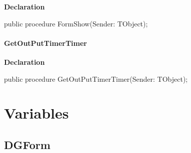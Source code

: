 \documentclass{report}
\newif\ifpdf
\begin{document}
\label{dgunit.TDGForm-FormShow}
\begin{list}{}{
\setlength{\itemindent}{0cm}
\setlength{\listparindent}{0cm}
\setlength{\leftmargin}{\evensidemargin}
\addtolength{\leftmargin}{\tmplength}
\settowidth{\labelsep}{X}
\addtolength{\leftmargin}{\labelsep}
\setlength{\labelwidth}{\tmplength}
}
\item[\textbf{Declaration}\hfill]
\ifpdf
\begin{flushleft}
\fi
\begin{ttfamily}
public procedure FormShow(Sender: TObject);\end{ttfamily}

\ifpdf
\end{flushleft}
\fi

\end{list}
\paragraph*{GetOutPutTimerTimer}\hspace*{\fill}

\label{dgunit.TDGForm-GetOutPutTimerTimer}
\begin{list}{}{
\setlength{\itemindent}{0cm}
\setlength{\listparindent}{0cm}
\setlength{\leftmargin}{\evensidemargin}
\addtolength{\leftmargin}{\tmplength}
\settowidth{\labelsep}{X}
\addtolength{\leftmargin}{\labelsep}
\setlength{\labelwidth}{\tmplength}
}
\item[\textbf{Declaration}\hfill]
\ifpdf
\begin{flushleft}
\fi
\begin{ttfamily}
public procedure GetOutPutTimerTimer(Sender: TObject);\end{ttfamily}

\ifpdf
\end{flushleft}
\fi

\end{list}
\section{Variables}
\ifpdf
\subsection*{\large{\textbf{DGForm}}\normalsize\hspace{1ex}\hrulefill}
\else
\end{document}
